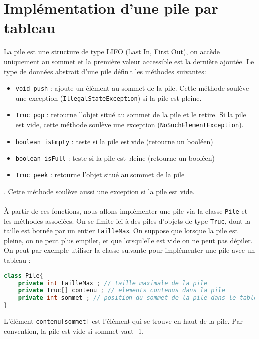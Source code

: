 \documentclass[iutinfo,a4paper,nocorrections,10pt]{ustl-tdtp}
\date{\annee{2018}--\annee{2019}}
\begin{document}
\maketitle
\thispagestyle{empty}


\section{Implémentation d'une pile par tableau}\label{implem}



La pile est une structure de type LIFO (Last In, First Out), on accède uniquement au sommet et la première valeur accessible est la dernière ajoutée. Le type de données abstrait d'une pile définit les méthodes suivantes:

\begin{itemize}
\item \texttt{void push} : ajoute un élément au sommet de la pile. Cette méthode soulève une exception (\texttt{IllegalStateException}) si la pile est pleine. 
\item \texttt{Truc pop} : retourne l’objet situé au sommet de la pile et le retire. Si la pile est vide, cette méthode soulève une exception (\texttt{NoSuchElementException}). 
\item \texttt{boolean isEmpty} : teste si la pile est vide (retourne un booléen)
\item \texttt{boolean isFull} : teste si la pile est pleine (retourne un booléen)
\item \texttt{Truc peek} : retourne l'objet situé au sommet de la pile
\end{itemize}. Cette méthode soulève aussi une exception si la pile est vide.
\paragraph{}
À partir de ces fonctions, nous allons implémenter une pile via la classe \texttt{Pile} et les méthodes associées. On se limite ici à des piles d'objets de type \texttt{Truc}, dont la taille est bornée par un entier \texttt{tailleMax}. On suppose que lorsque la pile est pleine, on ne peut plus empiler, et que lorsqu’elle est vide on ne peut pas dépiler. 
On peut par exemple utiliser la classe suivante pour implémenter une pile avec un tableau :

\begin{lstlisting}[language=Java]
class Pile{
	private int tailleMax ; // taille maximale de la pile
	private Truc[] contenu ; // elements contenus dans la pile
	private int sommet ; // position du sommet de la pile dans le tableau
}

\end{lstlisting}
L'élément \texttt{contenu[sommet]} est l'élément qui se trouve en haut de la pile. Par convention, la pile est vide si sommet vaut -1.
\end{document}
